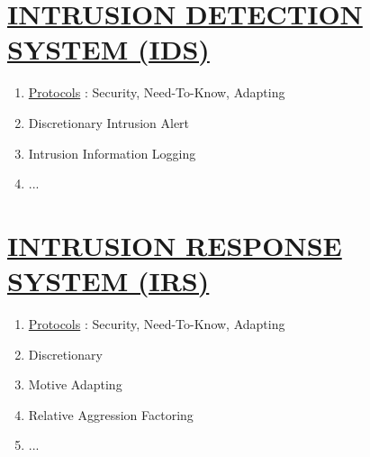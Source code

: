 \documentclass[11pt]{article}
\begin{document}
\section*{\ul{INTRUSION DETECTION SYSTEM (IDS)}}
\begin{enumerate}
	\item[] \ul{Protocols} : Security, Need-To-Know, Adapting
	
	\item[] Discretionary Intrusion Alert
	\item[] Intrusion Information Logging
	\item[] ...
	
\end{enumerate}


\section*{\ul{INTRUSION RESPONSE SYSTEM (IRS)}}
\begin{enumerate}
	\item[] \ul{Protocols} : Security, Need-To-Know, Adapting
	
	\item[] Discretionary
	\item[] Motive Adapting
	\item[] Relative Aggression Factoring
	\item[] ...
	
\end{enumerate}
\end{document}
